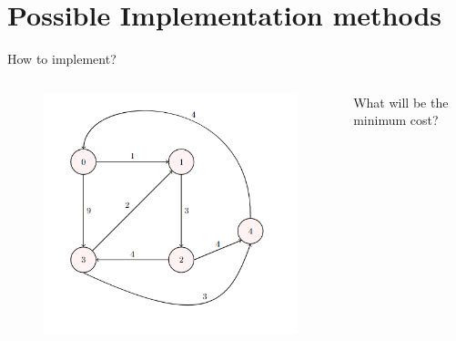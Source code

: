 \documentclass{beamer}
\begin{document}
\section{Possible Implementation methods}
\begin{frame}{How to implement?}
    \begin{columns}
    \begin{figure}[h]
        \centering
        \includegraphics[scale=0.6]{g1.png}
    \end{figure}
    What will be the minimum cost?
    \end{columns}
\end{frame}
\end{document}
